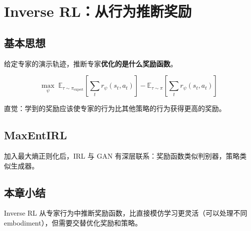 \section{Inverse RL：从行为推断奖励}

\subsection{基本思想}

给定专家的演示轨迹，推断专家\textbf{优化的是什么奖励函数}。

$$\max_\psi \; \mathbb{E}_{\tau \sim \pi_{\text{expert}}}\left[\sum_t r_\psi(s_t, a_t)\right] - \mathbb{E}_{\tau \sim \pi}\left[\sum_t r_\psi(s_t, a_t)\right]$$

直觉：学到的奖励应该使专家的行为比其他策略的行为获得更高的奖励。

\subsection{MaxEntIRL}

加入最大熵正则化后，IRL 与 GAN 有深层联系：奖励函数类似判别器，策略类似生成器。

\subsection{本章小结}

Inverse RL 从专家行为中推断奖励函数，比直接模仿学习更灵活（可以处理不同 embodiment），但需要交替优化奖励和策略。

